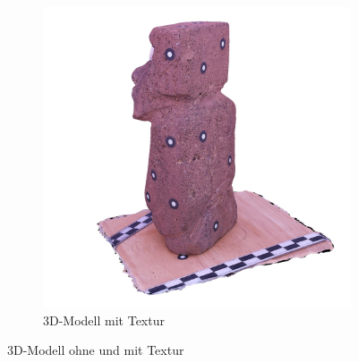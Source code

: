 \documentclass[./00PhotoBox.tex]{subfiles}
\begin{document}
\begin{figure}
\begin{subfigure}{0.49\textwidth}
        \includegraphics[width=1\linewidth]{img/2_grundlagen/textur.jpg}
        \centering
        \caption{3D-Modell mit Textur} %
        \label{img:mit_textur} %
    \end{subfigure}
    \caption{3D-Modell ohne und mit Textur} %
    \label{img:texturierung} %
\end{figure}

\biblio
\end{document}
